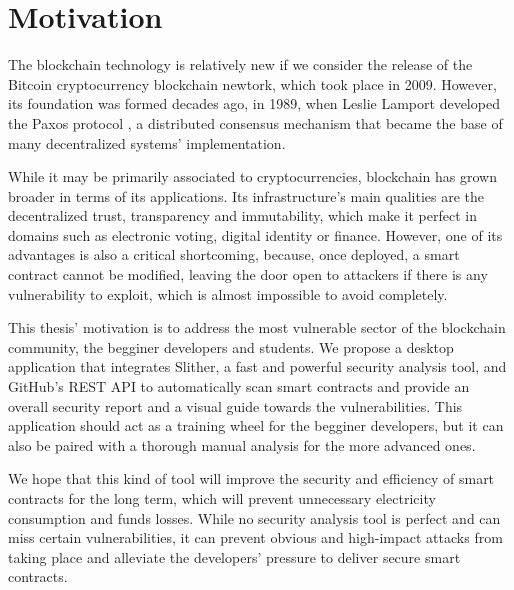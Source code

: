 \chapter*{Motivation} 

The blockchain technology \cite{blockchain} is relatively new if we consider the release of the Bitcoin cryptocurrency blockchain newtork, which took place in 2009. However, its foundation was formed decades ago, in 1989, when Leslie Lamport developed the Paxos protocol \cite{paxos}, a distributed consensus mechanism that became the base of many decentralized systems' implementation.

While it may be primarily associated to cryptocurrencies, blockchain has grown broader in terms of its applications. Its infrastructure's main qualities are the decentralized trust, transparency and immutability, which make it perfect in domains such as electronic voting, digital identity or finance. However, one of its advantages is also a critical shortcoming, because, once deployed, a smart contract cannot be modified, leaving the door open to attackers if there is any vulnerability to exploit, which is almost impossible to avoid completely.

This thesis' motivation is to address the most vulnerable sector of the blockchain community, the begginer developers and students. We propose a desktop application that integrates Slither, a fast and powerful security analysis tool, and GitHub's REST API to automatically scan smart contracts and provide an overall security report and a visual guide towards the vulnerabilities. This application should act as a training wheel for the begginer developers, but it can also be paired with a thorough manual analysis for the more advanced ones.

We hope that this kind of tool will improve the security and efficiency of smart contracts for the long term, which will prevent unnecessary electricity consumption and funds losses. While no security analysis tool is perfect and can miss certain vulnerabilities, it can prevent obvious and high-impact attacks from taking place and alleviate the developers' pressure to deliver secure smart contracts.